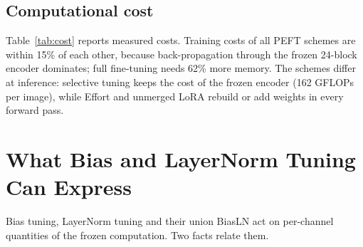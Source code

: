 \documentclass[fonts]{icst}
\begin{document}
\subsection{Computational cost}
\label{sec:cost}
Table~\ref{tab:cost} reports measured costs. Training costs of all PEFT schemes are within 15\% of each other, because back-propagation through the frozen 24-block encoder dominates; full fine-tuning needs 62\% more memory. The schemes differ at inference: selective tuning keeps the cost of the frozen encoder (162 GFLOPs per image), while Effort and unmerged LoRA rebuild or add weights in every forward pass.

\begin{table}[!t]
\centering
\caption{Measured cost on an NVIDIA A100-40GB (fp32, $224\times224$). Train: batch 32, forward + backward + Adam step. Infer: batch 1. Ckpt: size of the stored trainable tensors.}
\label{tab:cost}
\end{table}

\section{What Bias and LayerNorm Tuning Can Express}
\label{sec:analysis}

Bias tuning, LayerNorm tuning and their union BiasLN act on per-channel quantities of the frozen computation. Two facts relate them.
\end{document}
